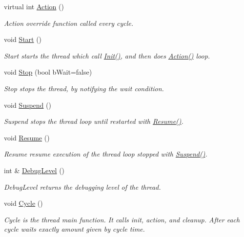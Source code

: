 \begin{DoxyCompactItemize}
virtual int \hyperlink{classRCS_1_1CMsgQueueThread_ac348fb5db221c3a6502a15f60963e047}{Action} ()
\begin{DoxyCompactList}\small\item\em Action override function called every cycle. \end{DoxyCompactList}\item 
void \hyperlink{classRCS_1_1CMsgQueueThread_a22265a333cc1260e666c059e3cf66a45}{Start} ()
\begin{DoxyCompactList}\small\item\em Start starts the thread which call \hyperlink{classRCS_1_1CMsgQueueThread_a43d2b0e9a8811115d2fd805c7291d676}{Init()}, and then does \hyperlink{classRCS_1_1CMsgQueueThread_ac348fb5db221c3a6502a15f60963e047}{Action()} loop. \end{DoxyCompactList}\item 
void \hyperlink{classRCS_1_1CMsgQueueThread_ab44bf2c1a6b1aa4130ccb75b60337398}{Stop} (bool b\-Wait=false)
\begin{DoxyCompactList}\small\item\em Stop stops the thread, by notifying the wait condition. \end{DoxyCompactList}\item 
void \hyperlink{classRCS_1_1CMsgQueueThread_a8822227bd0522cb2b32f3c69b2dc8ed1}{Suspend} ()
\begin{DoxyCompactList}\small\item\em Suspend stops the thread loop until restarted with \hyperlink{classRCS_1_1CMsgQueueThread_aa7f583a7ec672c66b2bdb057d2adf63c}{Resume()}. \end{DoxyCompactList}\item 
void \hyperlink{classRCS_1_1CMsgQueueThread_aa7f583a7ec672c66b2bdb057d2adf63c}{Resume} ()
\begin{DoxyCompactList}\small\item\em Resume resume execution of the thread loop stopped with \hyperlink{classRCS_1_1CMsgQueueThread_a8822227bd0522cb2b32f3c69b2dc8ed1}{Suspend()}. \end{DoxyCompactList}\item 
int \& \hyperlink{classRCS_1_1CMsgQueueThread_ad86be410679b125162eef984d7116c91}{Debug\-Level} ()
\begin{DoxyCompactList}\small\item\em Debug\-Level returns the debugging level of the thread. \end{DoxyCompactList}\item 
void \hyperlink{classRCS_1_1CMsgQueueThread_a7474536f6fe1bb89118e8a125b8fbb91}{Cycle} ()
\begin{DoxyCompactList}\small\item\em Cycle is the thread main function. It calls init, action, and cleanup. After each cycle waits exactly amount given by cycle time. \end{DoxyCompactList}\end{DoxyCompactItemize}
